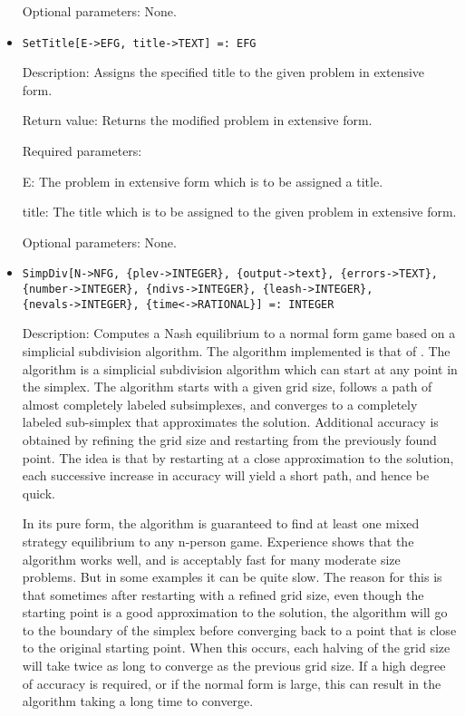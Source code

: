 \begin{itemize}
\item
[Optional parameters:] None.

\ed

\item

\protect \large \begin{verbatim}
SetTitle[E->EFG, title->TEXT] =: EFG
\end{verbatim}\normalsize

\bd
\item
[Description:] Assigns the specified title to the given problem in
extensive form.
\item
[Return value:] Returns the modified problem in extensive form.
\item
[Required parameters:]\hfil\null
	
\bd
\item
[E:] The problem in extensive form which is to be assigned a title.
\item
[title:] The title which is to be assigned to the given problem in
extensive form.
\ed

\item
[Optional parameters:] None.
\ed

\item
\protect \large \begin{verbatim}
SimpDiv[N->NFG, {plev->INTEGER}, {output->text}, {errors->TEXT},
{number->INTEGER}, {ndivs->INTEGER}, {leash->INTEGER},
{nevals->INTEGER}, {time<->RATIONAL}] =: INTEGER
\end{verbatim}\normalsize

\bd
\item
[Description:] Computes a Nash equilibrium to a normal form game based
on a simplicial subdivision algorithm.  The algorithm implemented is
that of \cite{VTH:1987}.  The 
algorithm is a simplicial subdivision algorithm which can start at any
point in the simplex.  The algorithm starts with a given grid size,
follows a path of almost completely labeled subsimplexes, and
converges to a completely labeled sub-simplex that approximates the
solution.  Additional accuracy is obtained by refining the grid size
and restarting from the previously found point.  The idea is that by
restarting at a close approximation to the solution, each successive
increase in accuracy will yield a short path, and hence be quick.

In its pure form, the algorithm is guaranteed to find at least one
mixed strategy equilibrium to any n-person game.  Experience shows
that the algorithm works well, and is acceptably fast for many
moderate size problems.  But in some examples it can be quite slow.
The reason for this is that sometimes after restarting with a refined
grid size, even though the starting point is a good approximation to
the solution, the algorithm will go to the boundary of the simplex
before converging back to a point that is close to the original
starting point.  When this occurs, each halving of the grid size will
take twice as long to converge as the previous grid size.  If a high
degree of accuracy is required, or if the normal form is large, this
can result in the algorithm taking a long time to converge.


\end{itemize}
